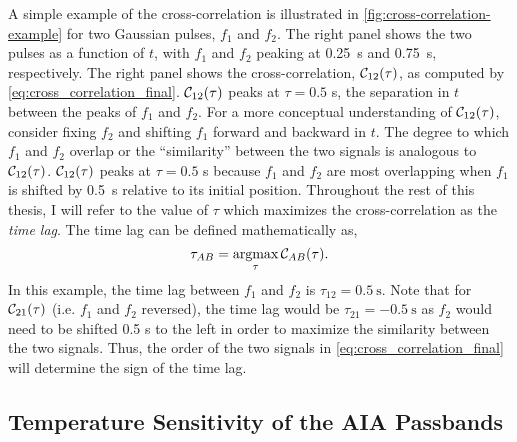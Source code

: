 A simple example of the cross-correlation is illustrated in \autoref{fig:cross-correlation-example} for two Gaussian pulses, $f_1$ and $f_2$. The right panel shows the two pulses as a function of $t$, with $f_1$ and $f_2$ peaking at \SI{0.25}{\second} and \SI{0.75}{\second}, respectively. The right panel shows the cross-correlation, $\crosscor[12]$, as computed by \autoref{eq:cross_correlation_final}. $\crosscor[12]$ peaks at $\tau=0.5$ \si{\second}, the separation in $t$ between the peaks of $f_1$ and $f_2$. For a more conceptual understanding of $\crosscor[12]$, consider fixing $f_2$ and shifting $f_1$ forward and backward in $t$. The degree to which $f_1$ and $f_2$ overlap or the ``similarity'' between the two signals is analogous to $\crosscor[12]$. $\crosscor[12]$ peaks at $\tau=0.5$ \si{\second} because $f_1$ and $f_2$ are most overlapping when $f_1$ is shifted by \SI{0.5}{\second} relative to its initial position. Throughout the rest of this thesis, I will refer to the value of $\tau$ which maximizes the cross-correlation as the \textit{time lag}. The time lag can be defined mathematically as,
\begin{equation}\label{eq:timelag}
    \tau_{AB} = \argmax_{\tau}\crosscor.
\end{equation}
In this example, the time lag between $f_1$ and $f_2$ is $\tau_{12}=\SI{0.5}{\second}$. Note that for $\crosscor[21]$ (i.e. $f_1$ and $f_2$ reversed), the time lag would be $\tau_{21}=\SI{-0.5}{\second}$ as $f_2$ would need to be shifted 0.5 s to the left in order to maximize the similarity between the two signals. Thus, the order of the two signals in \autoref{eq:cross_correlation_final} will determine the sign of the time lag.

\subsection{Temperature Sensitivity of the AIA Passbands}\label{subsec:aia_response}


